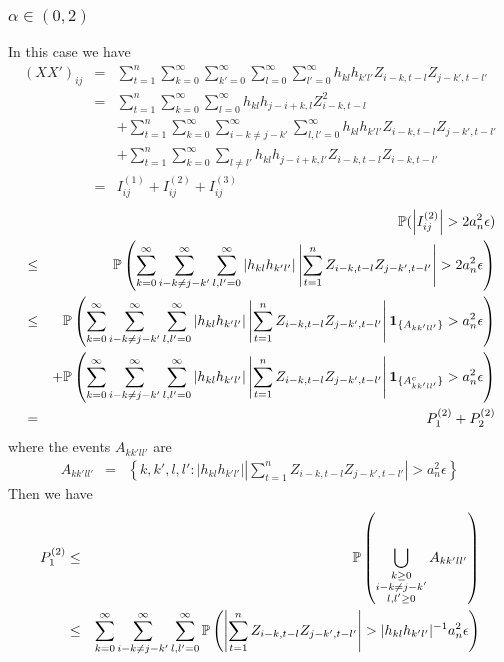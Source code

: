 \documentclass{article}
\begin{document}
\subsubsection[alpha in (0,2)]{$\alpha \in (0,2)$}
In this case we have
\begin{eqnarray*}
  (XX')_{ij} &=& \sum_{t=1}^n \sum_{k=0}^\infty \sum_{k'=0}^\infty
  \sum_{l=0}^\infty \sum_{l'=0}^\infty h_{kl} h_{k'l'} Z_{i-k,t-l}
  Z_{j-k',t-l'} \\
  &=& \sum_{t=1}^n \sum_{k=0}^\infty \sum_{l=0}^\infty h_{kl}
  h_{j-i+k,l} Z_{i-k, t-l}^2 \\
  && + \sum_{t=1}^n \sum_{k=0}^\infty \sum_{i-k \neq j-k'}^\infty
  \sum_{l,l'=0}^\infty h_{kl} h_{k'l'} Z_{i-k,t-l} Z_{j-k',t-l'} \\
  && + \sum_{t=1}^n \sum_{k=0}^\infty \sum_{l\neq l'} h_{kl}
  h_{j-i+k, l'} Z_{i-k,t-l} Z_{i-k,t-l'} \\
  &=& I^{(1)}_{ij} + I^{(2)}_{ij} + I^{(3)}_{ij}
\end{eqnarray*}
\begin{eqnarray*}
  && \P(\left| I^{(2)}_{ij} \right| > 2 a_n^2 \epsilon) \\
  &\leq& \P\left(
    \sum_{k=0}^\infty \sum_{i-k \neq j-k'}^\infty
    \sum_{l,l'=0}^\infty | h_{kl} h_{k'l'}| \left|
      \sum_{t=1}^n  Z_{i-k,t-l} Z_{j-k',t-l'} \right| > 2 a_n^2
    \epsilon \right) \\
  &\leq& \P\left(
    \sum_{k=0}^\infty \sum_{i-k \neq j-k'}^\infty
    \sum_{l,l'=0}^\infty | h_{kl} h_{k'l'}| \left|
      \sum_{t=1}^n  Z_{i-k,t-l} Z_{j-k',t-l'} \right|
    \I{A_{kk'll'}} > a_n^2 \epsilon
  \right) \\
  && + \P\left(
    \sum_{k=0}^\infty \sum_{i-k \neq j-k'}^\infty
    \sum_{l,l'=0}^\infty | h_{kl} h_{k'l'}| \left|
      \sum_{t=1}^n  Z_{i-k,t-l} Z_{j-k',t-l'} \right|
    \I{A^c_{kk'll'}} > a_n^2 \epsilon
  \right) \\
  &=& P^{(2)}_1 + P^{(2)}_2
\end{eqnarray*}
where the events $A_{kk'll'}$ are
\begin{eqnarray*}
  A_{kk'll'} &=& \left\{
  k,k',l,l': | h_{kl} h_{k'l'}| \left| \sum_{t=1}^n  Z_{i-k,t-l} Z_{j-k',t-l'}
  \right| > a_n^2 \epsilon
  \right\}
\end{eqnarray*}
Then we have
\begin{eqnarray*}
  P^{(2)}_1 &\leq& \P\left(
    \bigcup_{\substack{k \geq 0 \\ i-k \neq j-k' \\ l,l'\geq0}}
    A_{kk'll'}
  \right) \\
  &\leq& \sum_{k=0}^\infty \sum_{i-k \neq j-k'}^\infty
  \sum_{l,l'=0}^\infty \P\left(
    \left| \sum_{t=1}^n  Z_{i-k,t-l} Z_{j-k',t-l'}
    \right| > | h_{kl} h_{k'l'}|^{-1} a_n^2 \epsilon 
  \right)
\end{eqnarray*}
\end{document}
